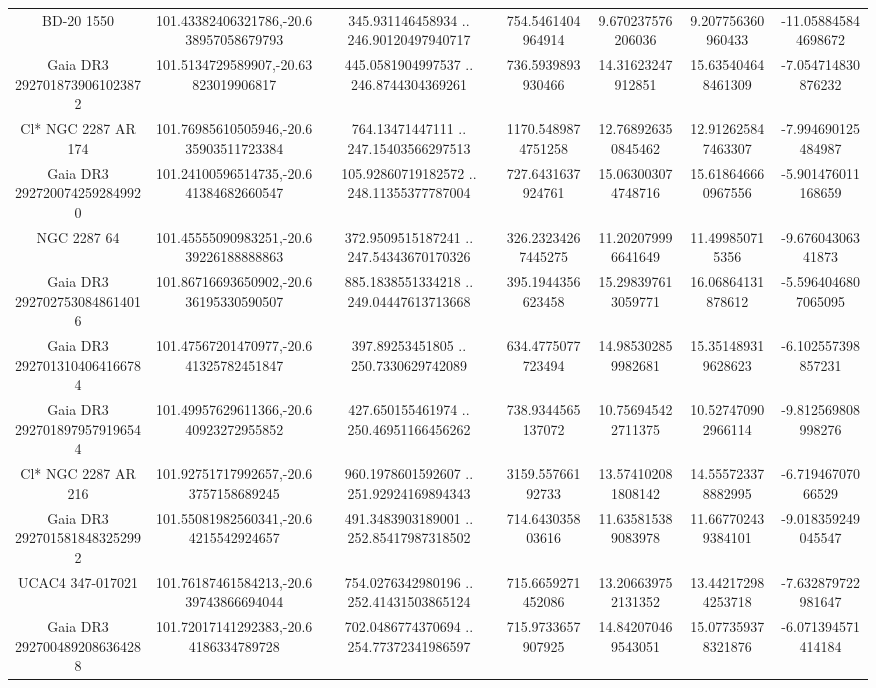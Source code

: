 \begin{table}
\begin{tabular}{ccccccc}
BD-20  1550 & 101.43382406321786,-20.638957058679793 & 345.931146458934 .. 246.90120497940717 & 754.5461404964914 & 9.670237576206036 & 9.207756360960433 & -11.058845844698672 \\
Gaia DR3 2927018739061023872 & 101.5134729589907,-20.63823019906817 & 445.0581904997537 .. 246.8744304369261 & 736.5939893930466 & 14.31623247912851 & 15.635404648461309 & -7.054714830876232 \\
Cl* NGC 2287     AR     174 & 101.76985610505946,-20.635903511723384 & 764.13471447111 .. 247.15403566297513 & 1170.5489874751258 & 12.768926350845462 & 12.912625847463307 & -7.994690125484987 \\
Gaia DR3 2927200742592849920 & 101.24100596514735,-20.641384682660547 & 105.92860719182572 .. 248.11355377787004 & 727.6431637924761 & 15.063003074748716 & 15.618646660967556 & -5.901476011168659 \\
NGC  2287    64 & 101.45555090983251,-20.639226188888863 & 372.9509515187241 .. 247.54343670170326 & 326.23234267445275 & 11.202079996641649 & 11.499850715356 & -9.67604306341873 \\
Gaia DR3 2927027530848614016 & 101.86716693650902,-20.636195330590507 & 885.1838551334218 .. 249.04447613713668 & 395.1944356623458 & 15.298397613059771 & 16.06864131878612 & -5.5964046807065095 \\
Gaia DR3 2927013104064166784 & 101.47567201470977,-20.641325782451847 & 397.89253451805 .. 250.7330629742089 & 634.4775077723494 & 14.985302859982681 & 15.351489319628623 & -6.102557398857231 \\
Gaia DR3 2927018979579196544 & 101.49957629611366,-20.640923272955852 & 427.650155461974 .. 250.46951166456262 & 738.9344565137072 & 10.756945422711375 & 10.527470902966114 & -9.812569808998276 \\
Cl* NGC 2287     AR     216 & 101.92751717992657,-20.63757158689245 & 960.1978601592607 .. 251.92924169894343 & 3159.55766192733 & 13.574102081808142 & 14.555723378882995 & -6.71946707066529 \\
Gaia DR3 2927015818483252992 & 101.55081982560341,-20.64215542924657 & 491.3483903189001 .. 252.85417987318502 & 714.643035803616 & 11.635815389083978 & 11.667702439384101 & -9.018359249045547 \\
UCAC4 347-017021 & 101.76187461584213,-20.639743866694044 & 754.0276342980196 .. 252.41431503865124 & 715.6659271452086 & 13.206639752131352 & 13.442172984253718 & -7.632879722981647 \\
Gaia DR3 2927004892086364288 & 101.72017141292383,-20.64186334789728 & 702.0486774370694 .. 254.77372341986597 & 715.9733657907925 & 14.842070469543051 & 15.077359378321876 & -6.071394571414184 \\

\end{tabular}
\end{table}
